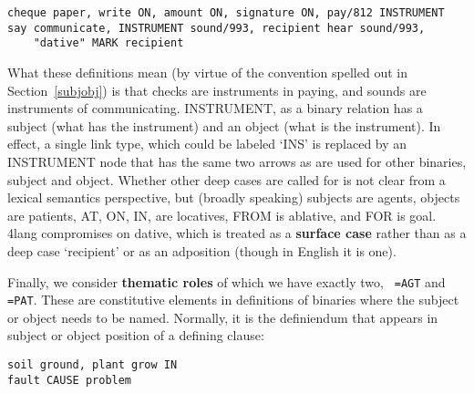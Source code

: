 \documentclass[11pt,bookmarks,bookmarksnumbered,naturalnames,plainpages=false,pdftex,colorlinks=true,urlcolor=blue,bookmarksdepth=subsection,plainpages=false]{paper}
\begin{document}
\begin{verbatim}
cheque paper, write ON, amount ON, signature ON, pay/812 INSTRUMENT
say communicate, INSTRUMENT sound/993, recipient hear sound/993, 
    "dative" MARK recipient
\end{verbatim}

What these definitions mean (by virtue of the convention spelled out in
Section~\ref{subjobj}) is that checks are instruments in paying, and sounds
are instruments of communicating. INSTRUMENT, as a binary relation has a
subject (what has the instrument) and an object (what is the instrument). In
effect, a single link type, which could be labeled `INS' is replaced by an
INSTRUMENT node that has the same two arrows as are used for other binaries,
subject and object. Whether other deep cases are called for is not clear from
a lexical semantics perspective, but (broadly speaking) subjects are agents,
objects are patients, AT, ON, IN, are locatives, FROM is ablative, and FOR is
goal. 4lang compromises on dative, which is treated as a {\bf surface case}
rather than as a deep case `recipient' or as an adposition (though in English
it is one). 



\bigskip
Finally, we consider {\bf thematic roles} of which we have exactly two, {\tt
  =AGT} and {\tt =PAT}. These are constitutive elements in definitions of
binaries where the subject or object needs to be named. Normally, it is the
definiendum that appears in subject or object position of a defining clause:

\begin{verbatim}
soil ground, plant grow IN
fault CAUSE problem
\end{verbatim}
\end{document}
